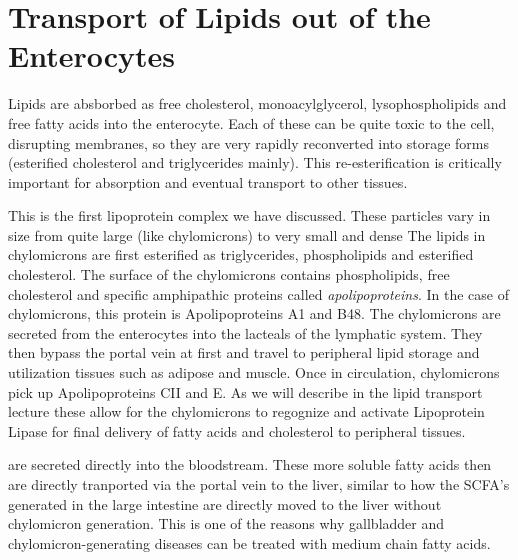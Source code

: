 \documentclass{tufte-handout}
\begin{document}
\section{Transport of Lipids out of the Enterocytes}

Lipids are absborbed as free cholesterol, monoacylglycerol, lysophospholipids and free fatty acids into the enterocyte.  Each of these can be quite toxic to the cell, disrupting membranes, so they are very rapidly reconverted into storage forms (esterified cholesterol and triglycerides mainly).  This re-esterification is critically important for absorption and eventual transport to other tissues.

  This is the first lipoprotein complex we have discussed.  These particles vary in size from quite large (like chylomicrons) to very small and dense  The lipids in chylomicrons are first esterified as triglycerides, phospholipids and esterified cholesterol.  The surface of the chylomicrons contains phospholipids, free cholesterol and specific amphipathic proteins called \emph{apolipoproteins}.  In the case of chylomicrons, this protein is Apolipoproteins A1 and B48.  The chylomicrons are secreted from the enterocytes into the lacteals of the lymphatic system.  They then bypass the portal vein at first and travel to peripheral lipid storage and utilization tissues such as adipose and muscle.  Once in circulation, chylomicrons pick up Apolipoproteins CII and E.  As we will describe in the lipid transport lecture these allow for the chylomicrons to regognize and activate Lipoprotein Lipase for final delivery of fatty acids and cholesterol to peripheral tissues.  

 are secreted directly into the bloodstream.  These more soluble fatty acids then are directly tranported via the portal vein to the liver, similar to how the SCFA's generated in the large intestine are directly moved to the liver without chylomicron generation.  This is one of the reasons why gallbladder and chylomicron-generating diseases can be treated with medium chain fatty acids.




\end{document}
